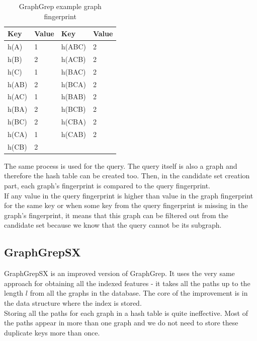 \begin{table}[h]
	\centering
	\renewcommand{\arraystretch}{2.5}
	\setlength{\arrayrulewidth}{0.5mm
	}
	\begin{tabular}[h!]{|p{3cm} p{3cm}|p{3cm} p{3cm}|}
		\hline
		\rowcolor{lightgray}
		Key & Value & Key & Value\\ \hline
		h(A) & 1 & h(ABC) & 2\\
		h(B) & 2 & h(ACB) & 2\\
		h(C) & 1 & h(BAC) & 2\\
		h(AB) & 2 & h(BCA) & 2\\
		h(AC) & 1 & h(BAB) & 2\\
		h(BA) & 2 & h(BCB) & 2\\
		h(BC) & 2 & h(CBA) & 2\\
		h(CA) & 1 & h(CAB) & 2\\
		h(CB) & 2 & & \\ \hline
	\end{tabular}
\caption{GraphGrep example graph fingerprint}
\label{tab:graphgrep}
\end{table}

The same process is used for the query. The query itself is also a graph and therefore the hash table can be created too. Then, in the candidate set creation part, each graph’s fingerprint is compared to the query fingerprint.\\

If any value in the query fingerprint is higher than value in the graph fingerprint for the same key or when some key from the query fingerprint is missing in the graph's fingerprint, it means that this graph can be filtered out from the candidate set because we know that the query cannot be its subgraph.

\subsection{GraphGrepSX}

GraphGrepSX is an improved version of GraphGrep. It uses the very same approach for obtaining all the indexed features - it takes all the paths up to the length $l$ from all the graphs in the database. The core of the improvement is in the data structure where the index is stored.\\

Storing all the paths for each graph in a hash table is quite ineffective. Most of the paths appear in more than one graph and we do not need to store these duplicate keys more than once.\\

